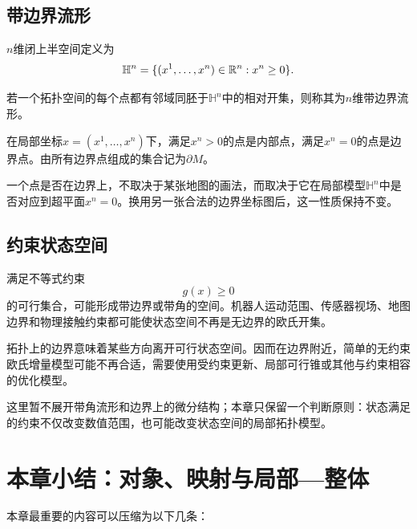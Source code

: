 \subsection{带边界流形}

\begin{definition}[闭上半空间]
$n$维闭上半空间定义为
\[
    \mathbb H^n
    =
    \{(x^1,\ldots,x^n)\in\mathbb{R}^n:x^n\ge 0\}.
\]
\end{definition}

\begin{definition}[带边界流形]
若一个拓扑空间的每个点都有邻域同胚于$\mathbb H^n$中的相对开集，则称其为$n$维带边界流形。
\end{definition}

在局部坐标$x=(x^1,\ldots,x^n)$下，满足$x^n>0$的点是内部点，满足$x^n=0$的点是边界点。由所有边界点组成的集合记为$\partial M$。

\begin{remark}[边界是局部性质]
一个点是否在边界上，不取决于某张地图的画法，而取决于它在局部模型$\mathbb H^n$中是否对应到超平面$x^n=0$。换用另一张合法的边界坐标图后，这一性质保持不变。
\end{remark}

\subsection{约束状态空间}

满足不等式约束
\[
    g(x)\ge 0
\]
的可行集合，可能形成带边界或带角的空间。机器人运动范围、传感器视场、地图边界和物理接触约束都可能使状态空间不再是无边界的欧氏开集。

\begin{proposition}[边界对优化的影响]
拓扑上的边界意味着某些方向离开可行状态空间。因而在边界附近，简单的无约束欧氏增量模型可能不再合适，需要使用受约束更新、局部可行锥或其他与约束相容的优化模型。
\end{proposition}

这里暂不展开带角流形和边界上的微分结构；本章只保留一个判断原则：状态满足的约束不仅改变数值范围，也可能改变状态空间的局部拓扑模型。


\section{本章小结：对象、映射与局部—整体}

本章最重要的内容可以压缩为以下几条：

